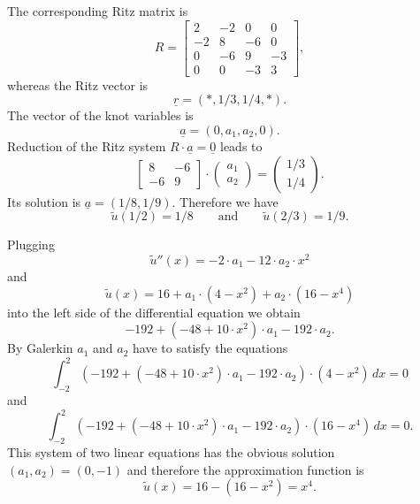\begin{loesung}
\begin{teilaufgaben}
\item
The corresponding Ritz matrix is
\begin{equation}
R
=
\left[\begin{array}{rrrr}
 2 & -2 &  0 &  0 \\
-2 &  8 & -6 &  0 \\
 0 & -6 &  9 & -3 \\
 0 &  0 & -3 &  3
\end{array}\right],
\tag{\bf 1P}
\end{equation}
whereas the Ritz vector is
\[
\underline{r} = (*,1/3,1/4,*).
\]
The vector of the knot variables is
\[
\underline{a} = (0, a_1, a_2, 0).
\]
Reduction of the Ritz system $R \cdot  \underline{a} = \underline{0}$
leads to  
\[
\left[\begin{array}{rr}  8 & -6 \\  -6 & 9  \end{array}\right]
\cdot
\left(\begin{array}{r} a_1 \\ a_2 \end{array}\right)
=
\left(\begin{array}{r} 1/3 \\ 1/4 \end{array}\right).
\]
Its solution is $\underline{a} = (1/8, 1/9)$.
Therefore we have
\begin{equation}
\tilde u(1/2) = 1/8
\qquad\text{and}\qquad
\tilde u(2/3) = 1/9.
\tag{\bf 1P}
\end{equation}
%
\item
Plugging
\[
\tilde u''(x) = -2 \cdot a_1 - 12 \cdot a_2 \cdot x^2
\]
and
\[
\tilde u(x) = 16 + a_1 \cdot (4 - x^2) + a_2 \cdot (16 - x^4)
\]
into the left side of the differential equation we obtain
\begin{equation}
-192 + (-48 + 10 \cdot x^2) \cdot a_1 - 192 \cdot a_2.
\tag{\bf 1P}
\end{equation}
By Galerkin $a_1$ and $a_2$ have to satisfy the equations
\[
\int_{-2}^2
(-192 + (-48 + 10 \cdot x^2) \cdot a_1 - 192 \cdot a_2) \cdot (4 - x^2)
\,dx
=
0
\]
and
\begin{equation}
\int_{-2}^2
(-192 + (-48 + 10 \cdot x^2) \cdot a_1 - 192 \cdot a_2) \cdot (16 - x^4)
\,dx
=
0.
\tag{\bf 2P}
\end{equation}
This system of two linear equations has the obvious solution
$(a_1, a_2) = (0,-1)$
and therefore the approximation function is
\begin{equation}
\tilde u(x) = 16 - (16 - x^2) = x^4.
\tag{\bf 1P}
\end{equation}
\end{teilaufgaben}
\end{loesung}
